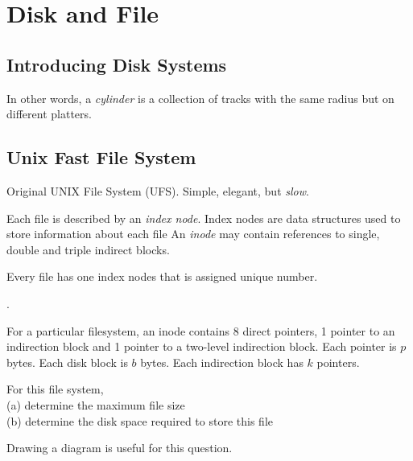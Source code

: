 
\chapter{Disk and File}


\section{Introducing Disk Systems}





In other words, a \textit{cylinder} is a collection of tracks 
with the same radius but on different platters.


\section{Unix Fast File System}

Original UNIX File System (UFS).
Simple, elegant, but \textit{slow}.


Each file is described by an \textit{index node}.
Index nodes are data structures used to store information about each file
An \textit{inode} may contain references to single, double 
and triple indirect blocks.

Every file has one index nodes that is assigned unique number.




.

\begin{example}
For a particular filesystem, an inode contains 8 direct pointers, 
1 pointer to an indirection block and 1 pointer to a 
two-level indirection block. 
Each pointer is $p$ bytes. Each disk block is $b$ bytes.
Each indirection block has $k$ pointers.

For this file system, \\
(a) determine the maximum file size \\
(b) determine the disk space required to store this file
\end{example}


Drawing a diagram is useful for this question. 

